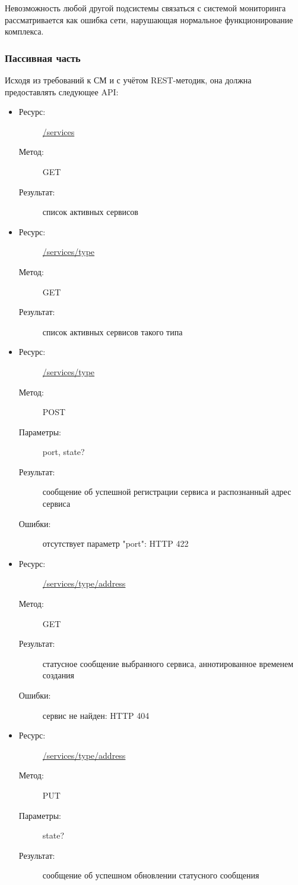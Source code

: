 \documentclass[a4paper,12pt]{report}
\numberwithin{equation}{section}
\begin{document}
  Невозможность любой другой подсистемы связаться с системой мониторинга рассматривается
  как ошибка сети, нарушающая нормальное функционирование комплекса.
  
  \subsubsection{Пассивная часть}
  Исходя из требований к СМ и с учётом REST-методик, она должна предоставлять следующее API:
  
  \begin{itemize}
    \item
    \begin{description}
      \item[Ресурс:] \url{/services}
      \item[Метод:] GET
      \item[Результат:] список активных сервисов
    \end{description}
    \item
    \begin{description}
      \item[Ресурс:] \url{/services/type}
      \item[Метод:] GET
      \item[Результат:] список активных сервисов такого типа
    \end{description}
    \item
    \begin{description}
      \item[Ресурс:] \url{/services/type}
      \item[Метод:] POST
      \item[Параметры:] port, state?
      \item[Результат:] сообщение об успешной регистрации сервиса и распознанный адрес сервиса
      \item[Ошибки:] отсутствует параметр "port": HTTP 422
    \end{description}
    \item
    \begin{description}
      \item[Ресурс:] \url{/services/type/address}
      \item[Метод:] GET
      \item[Результат:] статусное сообщение выбранного сервиса, аннотированное временем создания
      \item[Ошибки:] сервис не найден: HTTP 404
    \end{description}
    \item
    \begin{description}
      \item[Ресурс:] \url{/services/type/address}
      \item[Метод:] PUT
      \item[Параметры:] state?
      \item[Результат:] сообщение об успешном обновлении статусного сообщения
    \end{description}
  \end{itemize}
  
\end{document}
